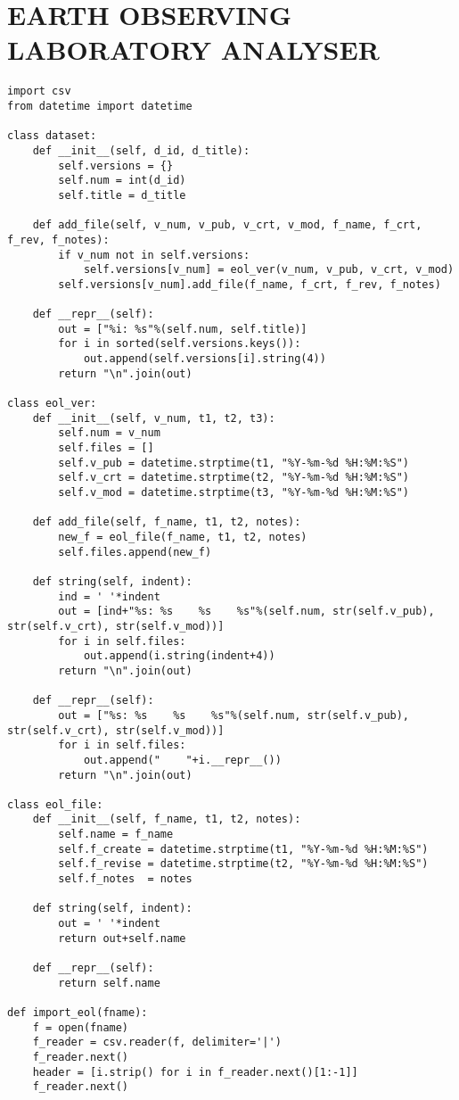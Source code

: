 \chapter{EARTH OBSERVING LABORATORY ANALYSER} \label{app:eol}
\begin{verbatim}
import csv
from datetime import datetime

class dataset:
	def __init__(self, d_id, d_title):
		self.versions = {}
		self.num = int(d_id)
		self.title = d_title

	def add_file(self, v_num, v_pub, v_crt, v_mod, f_name, f_crt, f_rev, f_notes):
		if v_num not in self.versions:
			self.versions[v_num] = eol_ver(v_num, v_pub, v_crt, v_mod)
		self.versions[v_num].add_file(f_name, f_crt, f_rev, f_notes)

	def __repr__(self):
		out = ["%i: %s"%(self.num, self.title)]
		for i in sorted(self.versions.keys()):
			out.append(self.versions[i].string(4))
		return "\n".join(out)

class eol_ver:
	def __init__(self, v_num, t1, t2, t3):
		self.num = v_num
		self.files = []
		self.v_pub = datetime.strptime(t1, "%Y-%m-%d %H:%M:%S")
		self.v_crt = datetime.strptime(t2, "%Y-%m-%d %H:%M:%S")
		self.v_mod = datetime.strptime(t3, "%Y-%m-%d %H:%M:%S")

	def add_file(self, f_name, t1, t2, notes):
		new_f = eol_file(f_name, t1, t2, notes)
		self.files.append(new_f)

	def string(self, indent):
		ind = ' '*indent
		out = [ind+"%s: %s    %s    %s"%(self.num, str(self.v_pub), str(self.v_crt), str(self.v_mod))]
		for i in self.files:
			out.append(i.string(indent+4))
		return "\n".join(out)

	def __repr__(self):
		out = ["%s: %s    %s    %s"%(self.num, str(self.v_pub), str(self.v_crt), str(self.v_mod))]
		for i in self.files:
			out.append("    "+i.__repr__())
		return "\n".join(out)

class eol_file:
	def __init__(self, f_name, t1, t2, notes):
		self.name = f_name
		self.f_create = datetime.strptime(t1, "%Y-%m-%d %H:%M:%S")
		self.f_revise = datetime.strptime(t2, "%Y-%m-%d %H:%M:%S")
		self.f_notes  = notes

	def string(self, indent):
		out = ' '*indent
		return out+self.name

	def __repr__(self):
		return self.name

def import_eol(fname):
	f = open(fname)
	f_reader = csv.reader(f, delimiter='|')
	f_reader.next()
	header = [i.strip() for i in f_reader.next()[1:-1]]
	f_reader.next()


\end{verbatim}
